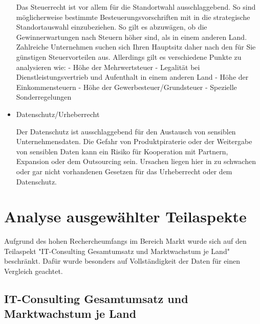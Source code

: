 \begin{itemize}
 Das Steuerrecht ist vor allem für die Standortwahl ausschlaggebend. 
 So sind möglicherweise bestimmte Besteuerungsvorschriften mit in die strategische Standortauswahl einzubeziehen. So gilt es abzuwägen, ob die Gewinnerwartungen nach Steuern höher sind, als in einem anderen Land. Zahlreiche Unternehmen suchen sich Ihren Hauptsitz daher nach den für Sie günstigen Steuervorteilen aus.
 Allerdings gilt es verschiedene Punkte zu analysieren wie:
 - Höhe der Mehrwertsteuer
 - Legalität bei Dienstleistungsvertrieb und Aufenthalt in einem anderen Land
 - Höhe der Einkommensteuern
 - Höhe der Gewerbesteuer/Grundsteuer
 - Spezielle Sonderregelungen
  \\
\item {Datenschutz/Urheberrecht}

  Der Datenschutz ist ausschlaggebend für den Austausch von sensiblen Unternehmensdaten. 
  Die Gefahr von Produktpiraterie oder der Weitergabe von sensiblen Daten kann ein Risiko für Kooperation mit Partnern, Expansion oder dem Outsourcing sein. Ursachen liegen hier in zu schwachen oder gar nicht vorhandenen Gesetzen für das Urheberrecht oder dem Datenschutz.
  
  \end{itemize}

\section{Analyse ausgewählter Teilaspekte}
Aufgrund des hohen Rechercheumfangs im Bereich Markt wurde sich auf den Teilaspekt "IT-Consulting Gesamtumsatz und Marktwachstum je Land" beschränkt. Dafür wurde besonders auf Vollständigkeit der Daten für einen Vergleich geachtet. 
\subsection*{IT-Consulting Gesamtumsatz und Marktwachstum je Land}
\label{subsubsec:Gesamtumsatz}

